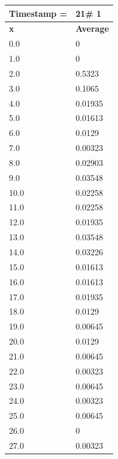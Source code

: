 \begin{tabular}{|l||l|}
\hline
\textbf{Timestamp =} & \textbf{21}\# 1\\\hline
	\textbf{x} & \textbf{Average} \\ \hline
\hline
	0.0 & 0 \\ \hline
	1.0 & 0 \\ \hline
	2.0 & 0.5323 \\ \hline
	3.0 & 0.1065 \\ \hline
	4.0 & 0.01935 \\ \hline
	5.0 & 0.01613 \\ \hline
	6.0 & 0.0129 \\ \hline
	7.0 & 0.00323 \\ \hline
	8.0 & 0.02903 \\ \hline
	9.0 & 0.03548 \\ \hline
	10.0 & 0.02258 \\ \hline
	11.0 & 0.02258 \\ \hline
	12.0 & 0.01935 \\ \hline
	13.0 & 0.03548 \\ \hline
	14.0 & 0.03226 \\ \hline
	15.0 & 0.01613 \\ \hline
	16.0 & 0.01613 \\ \hline
	17.0 & 0.01935 \\ \hline
	18.0 & 0.0129 \\ \hline
	19.0 & 0.00645 \\ \hline
	20.0 & 0.0129 \\ \hline
	21.0 & 0.00645 \\ \hline
	22.0 & 0.00323 \\ \hline
	23.0 & 0.00645 \\ \hline
	24.0 & 0.00323 \\ \hline
	25.0 & 0.00645 \\ \hline
	26.0 & 0 \\ \hline
	27.0 & 0.00323 \\ \hline
\end{tabular}

